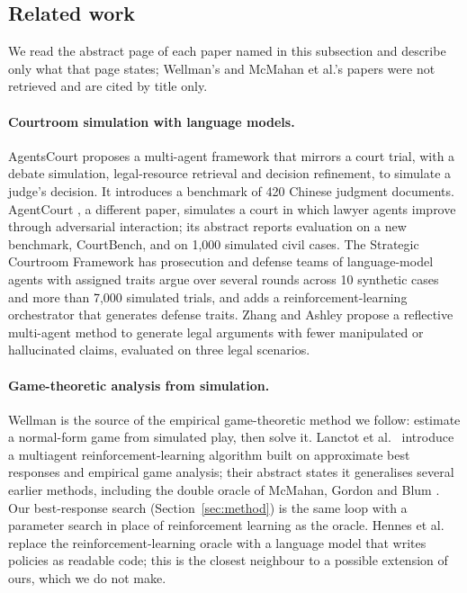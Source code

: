 \subsection{Related work}
We read the abstract page of each paper named in this subsection and describe only what that page states; Wellman's and McMahan et al.'s papers were not retrieved and are cited by title only.

\paragraph{Courtroom simulation with language models.} AgentsCourt \cite{agentscourt} proposes a multi-agent framework that mirrors a court trial, with a debate simulation, legal-resource retrieval and decision refinement, to simulate a judge's decision. It introduces a benchmark of 420 Chinese judgment documents. AgentCourt \cite{agentcourt}, a different paper, simulates a court in which lawyer agents improve through adversarial interaction; its abstract reports evaluation on a new benchmark, CourtBench, and on 1,000 simulated civil cases. The Strategic Courtroom Framework \cite{siedler} has prosecution and defense teams of language-model agents with assigned traits argue over several rounds across 10 synthetic cases and more than 7,000 simulated trials, and adds a reinforcement-learning orchestrator that generates defense traits. Zhang and Ashley \cite{zhang} propose a reflective multi-agent method to generate legal arguments with fewer manipulated or hallucinated claims, evaluated on three legal scenarios.

\paragraph{Game-theoretic analysis from simulation.} Wellman \cite{wellman} is the source of the empirical game-theoretic method we follow: estimate a normal-form game from simulated play, then solve it. Lanctot et al.\ \cite{psro} introduce a multiagent reinforcement-learning algorithm built on approximate best responses and empirical game analysis; their abstract states it generalises several earlier methods, including the double oracle of McMahan, Gordon and Blum \cite{mcmahan}. Our best-response search (Section~\ref{sec:method}) is the same loop with a parameter search in place of reinforcement learning as the oracle. Hennes et al.\ \cite{csro} replace the reinforcement-learning oracle with a language model that writes policies as readable code; this is the closest neighbour to a possible extension of ours, which we do not make.

